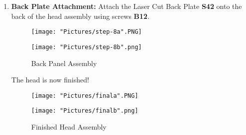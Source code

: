 \documentclass{article}
\begin{document}
\begin{enumerate}
\item \textbf{Back Plate Attachment:} Attach the Laser Cut Back Plate \textbf{S42} onto the back of the head assembly using screws \textbf{B12}.

\begin{figure}[H]
	\centering
  	\begin{minipage}[b]{0.45\textwidth}
		\texttt{[image: "Pictures/step-8a".PNG]}
  	\end{minipage}
  	\hfill
  	\begin{minipage}[b]{0.45\textwidth}
    		\texttt{[image: "Pictures/step-8b".png]}
  	\end{minipage}
  	\caption{Back Panel Assembly}
\end{figure}


The head is now finished!

\begin{figure}[H]
	\centering
  	\begin{minipage}[b]{0.45\textwidth}
		\texttt{[image: "Pictures/finala".PNG]}
  	\end{minipage}
  	\hfill
  	\begin{minipage}[b]{0.45\textwidth}
    		\texttt{[image: "Pictures/finalb".png]}
  	\end{minipage}
  	\caption{Finished Head Assembly}
\end{figure}

\end{enumerate}
\end{document}
